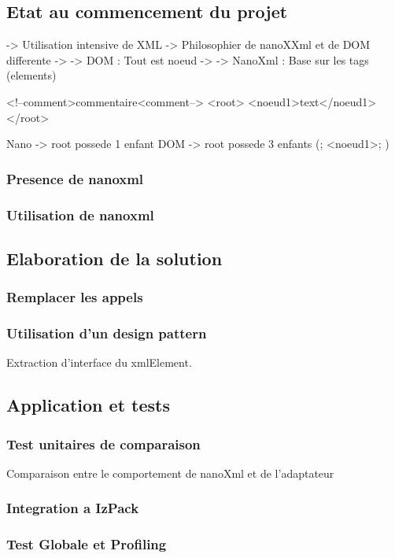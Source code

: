 \subsection{Etat au commencement du projet}
-> Utilisation intensive de XML
-> Philosophier de nanoXXml et de DOM differente
-> -> DOM : Tout est noeud
-> -> NanoXml : Base sur les tags (elements)

<!--comment>commentaire<comment-->
<root>
	<noeud1>text</noeud1>
</root>

Nano -> root possede 1 enfant
DOM -> root possede 3 enfants (\n; <noeud1>; \n)
\subsubsection{Presence de nanoxml}
\subsubsection{Utilisation de nanoxml}


\subsection{Elaboration de la solution}
\subsubsection{Remplacer les appels}
\subsubsection{Utilisation d'un design pattern}
Extraction d'interface du xmlElement.

\subsection{Application et tests}
\subsubsection{Test unitaires de comparaison}
Comparaison entre le comportement de nanoXml et de l'adaptateur
\subsubsection{Integration a IzPack}
\subsubsection{Test Globale et Profiling}

